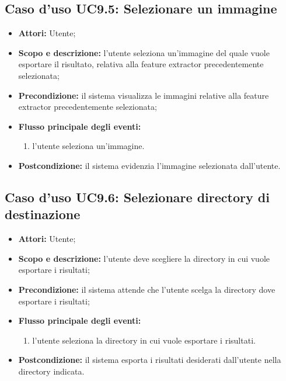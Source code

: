 \subsection{Caso d'uso UC9.5: Selezionare un immagine}
\begin{itemize}
\item \textbf{Attori:} Utente;
\item \textbf{Scopo e descrizione:} l'utente seleziona un'immagine del quale vuole esportare il risultato, relativa alla feature extractor\glossario{} precedentemente selezionata;
\item \textbf{Precondizione:} il sistema visualizza le immagini relative alla feature extractor\glossario{} precedentemente selezionata;
\item \textbf{Flusso principale degli eventi:}
\begin{enumerate}
\item l'utente seleziona un'immagine.
\end{enumerate}
\item \textbf{Postcondizione:} il sistema evidenzia l'immagine selezionata dall'utente.
\end{itemize}


\subsection{Caso d'uso UC9.6: Selezionare directory di destinazione}
\begin{itemize}
\item \textbf{Attori:} Utente;
\item \textbf{Scopo e descrizione:} l'utente deve scegliere la directory in cui vuole esportare i risultati;
\item \textbf{Precondizione:} il sistema attende che l'utente scelga la directory dove esportare i risultati;
\item \textbf{Flusso principale degli eventi:}
\begin{enumerate}
\item l'utente seleziona la directory in cui vuole esportare i risultati.
\end{enumerate}
\item \textbf{Postcondizione:} il sistema esporta i risultati desiderati dall'utente nella directory indicata.
\end{itemize}

